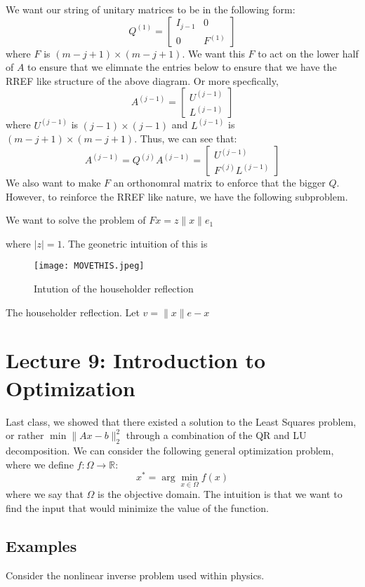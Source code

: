 \documentclass[11pt]{article}
\theoremstyle{definition}
\newcommand{\R}{\mathbb{R}}
\begin{document}
We want our string of unitary matrices to be in the following form:
\[
Q^{(1)} = \begin{bmatrix}
  I_{j-1} & 0 \\ 0 & F^{(1)}
\end{bmatrix}
\]
where $F$ is $(m - j + 1) \times (m - j + 1)$. We want this $F$ to act on the lower half of $A$ to ensure that we elimnate the entries below to ensure that we have the RREF like structure of the above diagram. Or more specfically, 
\[
A^{(j-1)} = \begin{bmatrix}
  U^{(j-1)} \\ L^{(j-1)}
\end{bmatrix}
\]
where $U^{(j-1)}$ is $(j-1) \times (j-1)$ and $L^{(j-1)}$ is $(m - j + 1) \times (m - j + 1)$. Thus, we can see that:
\[
A^{(j-1)} = Q^{(j)} A^{(j-1)} = \begin{bmatrix}
  U^{(j-1)} \\ F^{(j)} L^{(j-1)}
\end{bmatrix} 
\]
We also want to make $F$ an orthonomral matrix to enforce that the bigger $Q$. However, to reinforce the RREF like nature, we have the following subproblem. 
\begin{center}
  We want to solve the problem of $Fx = z \|x\| e_1$
\end{center}
where $|z| = 1$. The geonetric intuition of this is 
\begin{figure}[H]
    \centering
    \texttt{[image: MOVETHIS.jpeg]}
    \caption{Intution of the householder reflection}
    \label{fig:enter-label}
\end{figure}
The householder reflection. Let $v = \|x\|e - x$
\section{Lecture 9: Introduction to Optimization}
Last class, we showed that there existed a solution to the Least Squares problem, or rather $\min \|Ax - b\|^2_2$ through a combination of the QR and LU decomposition. We can consider the following general optimization problem, where we define $f: \Omega \to \R$:
\[
x^* = \arg \min_{x \in \Omega} f(x)
\]
where we say that $\Omega$ is the objective domain. The intuition is that we want to find the input that would minimize the value of the function. 
\subsection{Examples}
Consider the nonlinear inverse problem used within physics. 
\end{document}
